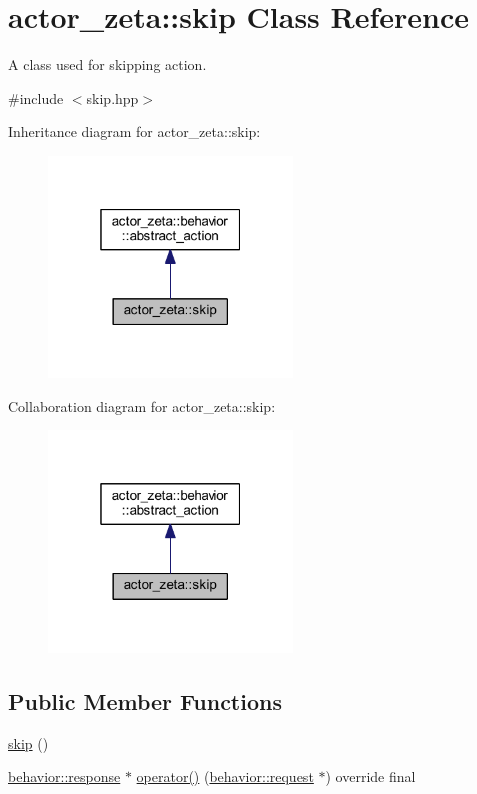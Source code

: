 \hypertarget{classactor__zeta_1_1skip}{}\section{actor\+\_\+zeta\+:\+:skip Class Reference}
\label{classactor__zeta_1_1skip}


A class used for skipping action.  




{\ttfamily \#include $<$skip.\+hpp$>$}



Inheritance diagram for actor\+\_\+zeta\+:\+:skip\+:\nopagebreak
\begin{figure}[H]
\begin{center}
\leavevmode
\includegraphics[width=184pt]{classactor__zeta_1_1skip__inherit__graph}
\end{center}
\end{figure}


Collaboration diagram for actor\+\_\+zeta\+:\+:skip\+:\nopagebreak
\begin{figure}[H]
\begin{center}
\leavevmode
\includegraphics[width=184pt]{classactor__zeta_1_1skip__coll__graph}
\end{center}
\end{figure}
\subsection*{Public Member Functions}
\begin{DoxyCompactItemize}
\item 
\hyperlink{classactor__zeta_1_1skip_a2a649385cc43b90561bbd106aadf55fe}{skip} ()
\item 
\hyperlink{classactor__zeta_1_1behavior_1_1response}{behavior\+::response} $\ast$ \hyperlink{classactor__zeta_1_1skip_a0a674c6ce55d365b2bae8ec19a58e29f}{operator()} (\hyperlink{classactor__zeta_1_1behavior_1_1request}{behavior\+::request} $\ast$) override final
\end{DoxyCompactItemize}


